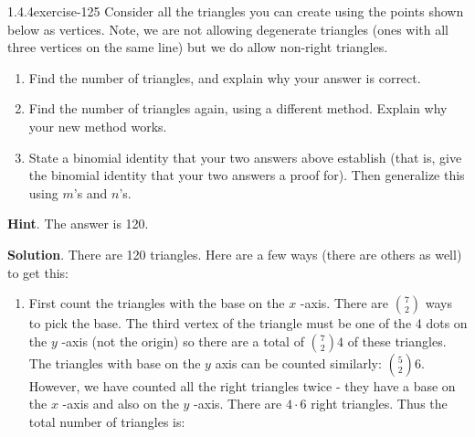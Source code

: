 \documentclass[twoside,11pt,]{book}
\numberwithin{equation}{chapter}
\begin{document}
\begin{divisionsolution}{1.4.4}{}{exercise-125}%
\hypertarget{p-2089}{}%
Consider all the triangles you can create using the points shown below as vertices. Note, we are not allowing degenerate triangles (ones with all three vertices on the same line) but we do allow non-right triangles.%
\begin{sidebyside}{1}{0.25}{0.25}{0}%
\begin{sbspanel}{0.5}%
\end{sbspanel}%
\end{sidebyside}%
\par
\hypertarget{p-2090}{}%
\leavevmode%
\begin{enumerate}[label=(\alph*)]
\item\hypertarget{li-1309}{}\hypertarget{p-2091}{}%
Find the number of triangles, and explain why your answer is correct.%
\item\hypertarget{li-1310}{}\hypertarget{p-2092}{}%
Find the number of triangles again, using a different method. Explain why your new method works.%
\item\hypertarget{li-1311}{}\hypertarget{p-2093}{}%
State a binomial identity that your two answers above establish (that is, give the binomial identity that your two answers a proof for). Then generalize this using \(m\)'s and \(n\)'s.%
\end{enumerate}
%
\par\smallskip%
\noindent\textbf{Hint}.\quad%
\hypertarget{p-2094}{}%
The answer is 120.%
\par\smallskip%
\noindent\textbf{Solution}.\quad%
\hypertarget{p-2095}{}%
There are 120 triangles. Here are a few ways (there are others as well) to get this:\leavevmode%
\begin{enumerate}[label=(\alph*)]
\item\hypertarget{li-1312}{}\hypertarget{p-2096}{}%
First count the triangles with the base on the \(x\) -axis. There are \({7 \choose 2}\) ways to pick the base. The third vertex of the triangle must be one of the 4 dots on the \(y\) -axis (not the origin) so there are a total of \({7 \choose 2}4\) of these triangles. The triangles with base on the \(y\) axis can be counted similarly: \({5 \choose 2}6\). However, we have counted all the right triangles twice - they have a base on the \(x\) -axis and also on the \(y\) -axis. There are \(4 \cdot 6\) right triangles. Thus the total number of triangles is:%

\end{enumerate}
\end{divisionsolution}
\end{document}
